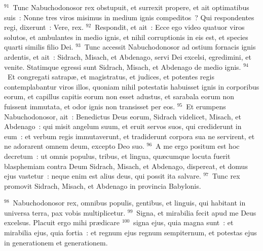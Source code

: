 ${}^{91}$~Tunc Nabuchodonosor rex obstupuit, et surrexit propere, et ait optimatibus suis~: Nonne tres viros misimus in medium ignis compeditos~? Qui respondentes regi, dixerunt~: Vere, rex.
${}^{92}$~Respondit, et ait~: Ecce ego video quatuor viros solutos, et ambulantes in medio ignis, et nihil corruptionis in eis est, et species quarti similis filio Dei.
${}^{93}$~Tunc accessit Nabuchodonosor ad ostium fornacis ignis ardentis, et ait~: Sidrach, Misach, et Abdenago, servi Dei excelsi, egredimini, et venite. Statimque egressi sunt Sidrach, Misach, et Abdenago de medio ignis.
${}^{94}$~Et congregati satrap\ae , et magistratus, et judices, et potentes regis contemplabantur viros illos, quoniam nihil potestatis habuisset ignis in corporibus eorum, et capillus capitis eorum non esset adustus, et sarabala eorum non fuissent immutata, et odor ignis non transisset per eos.
${}^{95}$~Et erumpens Nabuchodonosor, ait~: Benedictus Deus eorum, Sidrach videlicet, Misach, et Abdenago~: qui misit angelum suum, et eruit servos suos, qui crediderunt in eum~: et verbum regis immutaverunt, et tradiderunt corpora sua ne servirent, et ne adorarent omnem deum, excepto Deo suo.
${}^{96}$~A me ergo positum est hoc decretum~: ut omnis populus, tribus, et lingua, qu\ae cumque locuta fuerit blasphemiam contra Deum Sidrach, Misach, et Abdenago, dispereat, et domus ejus vastetur~: neque enim est alius deus, qui possit ita salvare.
${}^{97}$~Tunc rex promovit Sidrach, Misach, et Abdenago in provincia Babylonis.


${}^{98}$~Nabuchodonosor rex, omnibus populis, gentibus, et linguis, qui habitant in universa terra, pax vobis multiplicetur.
${}^{99}$~Signa, et mirabilia fecit apud me Deus excelsus. Placuit ergo mihi pr\ae dicare
${}^{100}$~signa ejus, quia magna sunt~: et mirabilia ejus, quia fortia~: et regnum ejus regnum sempiternum, et potestas ejus in generationem et generationem.

